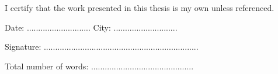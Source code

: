 \begin{flushleft}
I certify that the work presented in this thesis is my own unless referenced.


\vspace{0.5cm}

Date: ............................
\hspace{1cm} 
City: ............................ 

\vspace{0.5cm}
Signature: ....................................................................

\vspace{0.5cm}
Total number of words: .............................................

\end{flushleft}

\vspace*{\fill}
\pagebreak